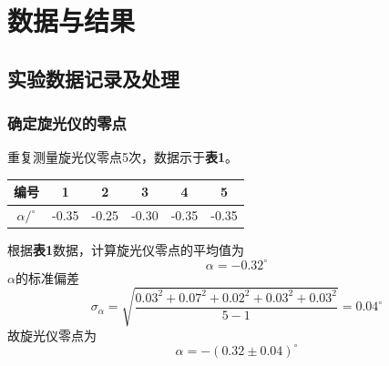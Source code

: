 \documentclass[12pt]{article}
\begin{document}
 \section{数据与结果}
 \subsection{实验数据记录及处理}
 \subsubsection{确定旋光仪的零点}
重复测量旋光仪零点5次，数据示于\textbf{表1}。
\begin{table}[h]
	\centering
	\begin{tabular}{cccccc}
		\toprule
		编号 & 1 & 2 & 3 & 4 & 5 \\
		\midrule
		$\alpha / ^{\circ}$ & -0.35 & -0.25 & -0.30 & -0.35 & -0.35\\
		\bottomrule
	\end{tabular}
\end{table}
\par
根据\textbf{表1}数据，计算旋光仪零点的平均值为
$$\alpha=-0.32^{\circ}
$$
$\alpha$的标准偏差
$$
\sigma_{\alpha}=\sqrt{\frac{0.03^{2}+0.07^{2}+0.02^{2}+0.03^{2}+0.03^{2}}{5-1}}=0.04^{\circ}
$$
故旋光仪零点为
$$\alpha=-(0.32\pm 0.04)^{\circ}
$$
\end{document}
